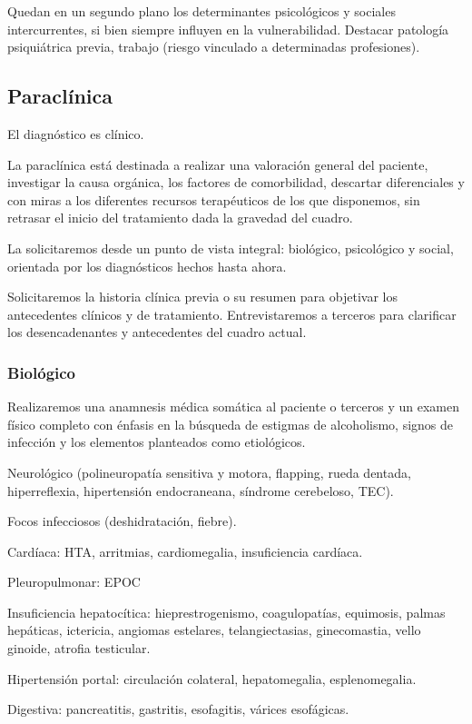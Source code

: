 Quedan en un segundo plano los determinantes psicológicos y sociales intercurrentes, si bien siempre influyen en la vulnerabilidad. Destacar patología psiquiátrica previa, trabajo (riesgo vinculado a determinadas profesiones).

\subsection*{Paraclínica}

El diagnóstico es clínico.

La paraclínica está destinada a realizar una valoración general del paciente, investigar la causa orgánica, los factores de comorbilidad, descartar diferenciales y con miras a los diferentes recursos terapéuticos de los que disponemos, sin retrasar el inicio del tratamiento dada la gravedad del cuadro.

La solicitaremos desde un punto de vista integral: biológico, psicológico y social, orientada por los diagnósticos hechos hasta ahora.

Solicitaremos la historia clínica previa o su resumen para objetivar los antecedentes clínicos y de tratamiento. Entrevistaremos a terceros para clarificar los desencadenantes y antecedentes del cuadro actual.

\subsubsection*{Biológico}

Realizaremos una anamnesis médica somática al paciente o terceros y un examen físico completo con énfasis en la búsqueda de estigmas de alcoholismo, signos de infección y los elementos planteados como etiológicos.

Neurológico (polineuropatía sensitiva y motora, flapping, rueda dentada, hiperreflexia, hipertensión endocraneana, síndrome cerebeloso, TEC).

Focos infecciosos (deshidratación, fiebre).

Cardíaca: HTA, arritmias, cardiomegalia, insuficiencia cardíaca.

Pleuropulmonar: EPOC

Insuficiencia hepatocítica: hieprestrogenismo, coagulopatías, equimosis, palmas hepáticas, ictericia, angiomas estelares, telangiectasias, ginecomastia, vello ginoide, atrofia testicular.

Hipertensión portal: circulación colateral, hepatomegalia, esplenomegalia.

Digestiva: pancreatitis, gastritis, esofagitis, várices esofágicas.

